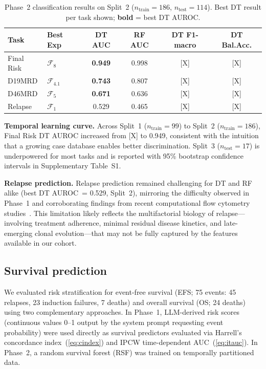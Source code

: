 \documentclass[pdflatex,sn-nature]{sn-jnl}
\begin{document}
\begin{table}[ht]
\caption{Phase~2 classification results on Split~2
($n_{\text{train}}=186$, $n_{\text{test}}=114$).
Best DT result per task shown; \textbf{bold} = best DT AUROC.}
\label{tab:p2class}
\centering
\small
\begin{tabular}{llcccc}
\toprule
\textbf{Task} & \textbf{Best Exp} & \textbf{DT AUC} & \textbf{RF AUC}
  & \textbf{DT F1-macro} & \textbf{DT Bal.Acc.} \\
\midrule
Final Risk   & $\mathcal{F}_8$   & \textbf{0.949} & 0.998 &
  [X] & [X] \\
D19MRD       & $\mathcal{F}_{4.1}$ & \textbf{0.743} & 0.807 &
  [X] & [X] \\
D46MRD       & $\mathcal{F}_5$   & \textbf{0.671} & 0.636 &
  [X] & [X] \\
Relapse      & $\mathcal{F}_1$   & 0.529 & 0.465 &
  [X] & [X] \\
\bottomrule
\end{tabular}
\end{table}

\textbf{Temporal learning curve.}
Across Split~1 ($n_{\text{train}}=99$) to Split~2
($n_{\text{train}}=186$), Final Risk DT AUROC increased from [X] to
0.949, consistent with the intuition that a growing case database
enables better discrimination.
Split~3 ($n_{\text{test}}=17$) is underpowered for most tasks and is
reported with 95\% bootstrap confidence intervals in
Supplementary Table~S1.

\textbf{Relapse prediction.}
Relapse prediction remained challenging for DT and RF alike (best
DT AUROC~= 0.529, Split~2), mirroring the difficulty observed in
Phase~1 and corroborating findings from
recent computational flow cytometry studies~\cite{[CITE:Martinez2025]}.
This limitation likely reflects the multifactorial biology of
relapse—involving treatment adherence, minimal residual disease
kinetics, and late-emerging clonal evolution—that may not be
fully captured by the features available in our cohort.

\subsection{Survival prediction}
\label{sec:survival}

We evaluated risk stratification for event-free survival (EFS; 75
events: 45 relapses, 23 induction failures, 7 deaths) and overall
survival (OS; 24 deaths) using two complementary approaches.
In Phase~1, LLM-derived risk scores (continuous values 0--1 output by
the system prompt requesting event probability) were used directly as
survival predictors evaluated via Harrell's concordance
index~(\ref{eq:cindex}) and IPCW time-dependent
AUC~(\ref{eq:itauc}).
In Phase~2, a random survival forest (RSF) was trained on temporally
partitioned data.
\end{document}

